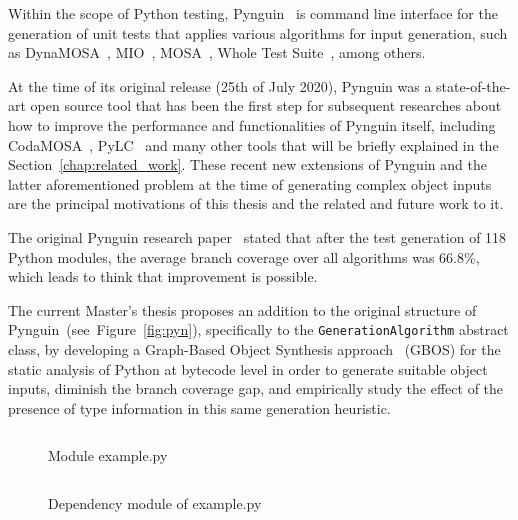 \documentclass[%
  chapterprefix=false,%
  open=right,%
  twoside=true,%
  paper=a4,%
  logofile={Figures/logo.png},%
  thesistype=master,%
  UKenglish,%
]{se2thesis}
\newcommand{\classname}[1]{\texttt{#1}}
\begin{document}
Within the scope of Python testing, Pynguin~\cite{DBLP:conf/icse/LukasczykF22} is command line interface for the generation of unit tests that applies various algorithms for input generation, such as DynaMOSA~\cite{DBLP:journals/tse/PanichellaKT18}, MIO~\cite{DBLP:conf/ssbse/Arcuri17}, MOSA~\cite{DBLP:conf/icst/PanichellaKT15}, Whole Test Suite~\cite{DBLP:journals/tse/FraserA13}, among others.

At the time of its original release (25th of July 2020), Pynguin was a state-of-the-art open source tool that has been the first step for subsequent researches about how to improve the performance and functionalities of Pynguin itself, including CodaMOSA~\cite{DBLP:conf/icse/LemieuxILS23}, PyLC~\cite{DBLP:conf/sac/SalariEAS23} and many other tools that will be briefly explained in the Section~\ref{chap:related_work}.
These recent new extensions of Pynguin and the latter aforementioned problem at the time of generating complex object inputs are the principal motivations of this thesis and the related and future work to it.

The original Pynguin research paper~\cite{DBLP:conf/icse/LukasczykF22} stated that after the test generation of 118 Python modules, the average branch coverage over all algorithms was $66.8\%$, which leads to think that improvement is possible.

The current Master's thesis proposes an addition to the original structure of Pynguin~(see~Figure~\ref{fig:pyn}), specifically to the \classname{GenerationAlgorithm} abstract class, by developing a Graph-Based Object Synthesis approach~\cite{DBLP:conf/sigsoft/0001O00D21} (GBOS) for the static analysis of Python at bytecode level in order to generate suitable object inputs, diminish the branch coverage gap, and empirically study the effect of the presence of type information in this same generation heuristic.

\begin{figure}
    \inputminted[linenos]{python}{Figures/example.py}
    \caption{Module example.py\label{lst:1}}
\end{figure}

\begin{figure}
  \inputminted[linenos]{python}{Figures/dependencies.py}
  \caption{Dependency module of example.py\label{lst:2}}
\end{figure}
\end{document}
